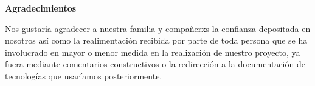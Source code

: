 
\newpage
\begin{center}
{\bf \Huge Agradecimientos}
\end{center}
\vspace{1cm}
\setlength{\baselineskip}{0.8cm}



Nos gustaría agradecer a nuestra familia y compañerxs la confianza depositada en nosotros así como la realimentación
recibida por parte de toda persona que se ha involucrado en mayor o menor medida en la realización de nuestro proyecto, ya 
fuera mediante comentarios constructivos o la redirección a la documentación de tecnologías que usaríamos posteriormente.
